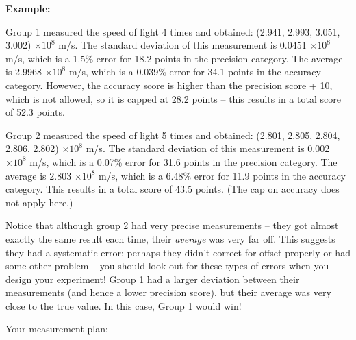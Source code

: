 \documentclass[12pt, letterpaper]{article}
\begin{document}
\textbf{Example:}
 
Group 1 measured the speed of light 4 times and obtained: (2.941, 2.993, 3.051, 3.002) $\times 10^8$ m/s.
The standard deviation of this measurement is 0.0451 $\times 10^8$ m/s, which is a 1.5\% error for 18.2 points in the precision category.
The average is 2.9968 $\times 10^8$ m/s, which is a 0.039\% error for 34.1 points in the accuracy category.
However, the accuracy score is higher than the precision score + 10, which is not allowed, so it is capped at 28.2 points -- this results in a total score of 52.3 points.


Group 2 measured the speed of light 5 times and obtained: (2.801, 2.805, 2.804, 2.806, 2.802) $\times 10^8$ m/s.
The standard deviation of this measurement is 0.002 $\times 10^8$ m/s, which is a 0.07\% error for 31.6 points in the precision category.
The average is 2.803 $\times 10^8$ m/s, which is a 6.48\% error for 11.9 points in the accuracy category.
This results in a total score of 43.5 points.  (The cap on accuracy does not apply here.)

Notice that although group 2 had very precise measurements -- they got almost exactly the same result each time, their \emph{average} was very far off.  
This suggests they had a systematic error: perhaps they didn't correct for offset properly or had some other problem -- you should look out for these types of errors when you design your experiment!
Group 1 had a larger deviation between their measurements (and hence a lower precision score), but their average was very close to the true value.
In this case, Group 1 would win!

\vspace{2em}

{\Large Your measurement plan:}

\fillgrid
\fillgrid
\end{document}
